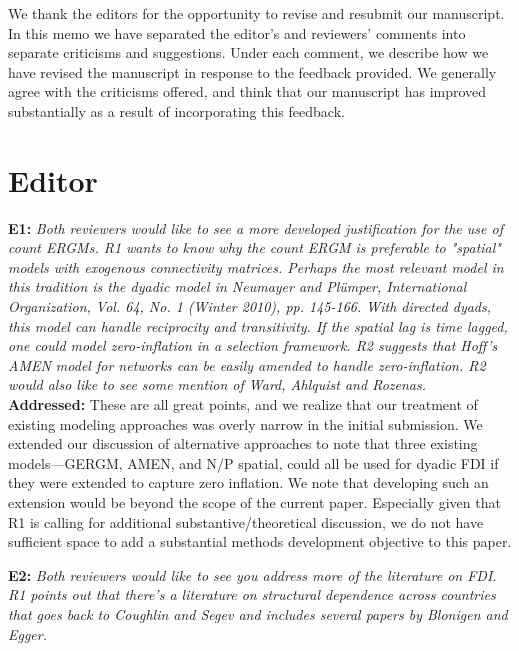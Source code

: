 \documentclass[a4paper,11pt]{texMemo}
\begin{document}
\maketitle

\noindent We thank the editors for the opportunity to revise and resubmit our manuscript. In this memo
we have separated the editor's and reviewers' comments into separate criticisms and
suggestions. Under each comment, we describe how we have revised the manuscript in
response to the feedback provided. We generally agree with the criticisms offered, and think
that our manuscript has improved substantially as a result of incorporating this feedback.


\section*{Editor}

\noindent \textbf{E1:} \emph{Both reviewers would like to see a more developed justification for the use of count ERGMs. R1 wants to know why the count ERGM is preferable to "spatial" models with exogenous connectivity matrices. Perhaps the most relevant model in this tradition is the dyadic model in Neumayer and Plümper, International Organization, Vol. 64, No. 1 (Winter 2010), pp. 145-166. With directed dyads, this model can handle reciprocity and transitivity. If the spatial lag is time lagged, one could model zero-inflation in a selection framework. R2 suggests that Hoff's AMEN model for networks can be easily amended to handle zero-inflation. R2 would also like to see some mention of Ward, Ahlquist and Rozenas.}\\

\noindent \textbf{Addressed:} These are all great points, and we realize that our treatment of existing modeling approaches was overly narrow in the initial submission. We extended our discussion of alternative approaches to note that three existing models---GERGM, AMEN, and N/P spatial, could all be used for dyadic FDI if they were extended to capture zero inflation. We note that developing such an extension would be beyond the scope of the current paper. Especially given that R1 is calling for additional substantive/theoretical discussion, we do not have sufficient space to add a substantial methods development objective to this paper.

\noindent \textbf{E2:} \emph{Both reviewers would like to see you address more of the literature on FDI. R1 points out that there's a literature on structural dependence across countries that goes back to Coughlin and Segev and includes several papers by Blonigen and Egger.} \\
\end{document}
